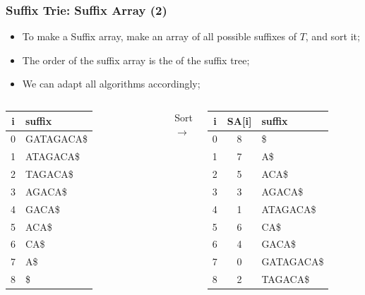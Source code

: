 \documentclass{beamer}
\begin{document}
\begin{frame}
  \frametitle{Suffix Trie: Suffix Array (2)}

  {\smaller

    \begin{itemize}
    \item To make a Suffix array, make an array of all possible
      suffixes of $T$, and sort it;
    \item The order of the suffix array is the
       of the suffix tree;
    \item We can adapt all algorithms accordingly;
    \end{itemize}

  \begin{columns}
    \begin{tabular}{c|l}
      i & suffix\\
      \hline
      0 & GATAGACA\$\\
      1 & ATAGACA\$\\
      2 & TAGACA\$\\
      3 & AGACA\$\\
      4 & GACA\$\\
      5 & ACA\$\\
      6 & CA\$\\
      7 & A\$\\
      8 & \$\\
    \end{tabular}
    Sort $\rightarrow$
    \begin{tabular}{c|c|l}
      i & SA[i] & suffix \\
      \hline
      0 & 8 & \$\\
      1 & 7 & A\$\\
      2 & 5 & ACA\$\\
      3 & 3 & AGACA\$\\
      4 & 1 & ATAGACA\$\\
      5 & 6 & CA\$\\
      6 & 4 & GACA\$\\
      7 & 0 & GATAGACA\$\\
      8 & 2 & TAGACA\$\\
    \end{tabular}
  \end{columns}
  }
\end{frame}
\end{document}
